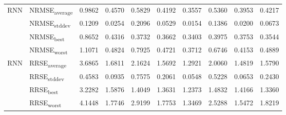 {\begin{longtable}{l l c c c c c c c c}
\cmidrule(lr){2-10}
\multirow{4}{*}{RNN} & NRMSE\textsubscript{average} & 0.9862 & 0.4570 & 0.5829 & 0.4192 & 0.3557 & 0.5360 & 0.3953 & 0.4217 \\
 & NRMSE\textsubscript{stddev} & 0.1209 & 0.0254 & 0.2096 & 0.0529 & 0.0154 & 0.1386 & 0.0200 & 0.0673 \\
 & NRMSE\textsubscript{best} & 0.8652 & 0.4316 & 0.3732 & 0.3662 & 0.3403 & 0.3975 & 0.3753 & 0.3544 \\
 & NRMSE\textsubscript{worst} & 1.1071 & 0.4824 & 0.7925 & 0.4721 & 0.3712 & 0.6746 & 0.4153 & 0.4889 \\
\cmidrule(lr){2-10}
\multirow{4}{*}{RNN} & RRSE\textsubscript{average} & 3.6865 & 1.6811 & 2.1624 & 1.5692 & 1.2921 & 2.0060 & 1.4819 & 1.5790 \\
 & RRSE\textsubscript{stddev} & 0.4583 & 0.0935 & 0.7575 & 0.2061 & 0.0548 & 0.5228 & 0.0653 & 0.2430 \\
 & RRSE\textsubscript{best} & 3.2282 & 1.5876 & 1.4049 & 1.3631 & 1.2373 & 1.4832 & 1.4166 & 1.3360 \\
 & RRSE\textsubscript{worst} & 4.1448 & 1.7746 & 2.9199 & 1.7753 & 1.3469 & 2.5288 & 1.5472 & 1.8219 \\
\cmidrule(lr){2-10}
\end{longtable}
}